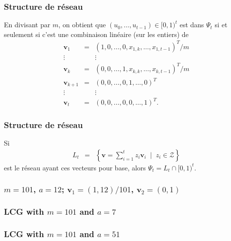 \documentclass[t,usepdftitle=false]{beamer}
\def\bv{\boldsymbol{v}}
\begin{document}
\begin{frame}
\frametitle{Structure de réseau}

En divisant par $m$, on obtient que
$(u_{0},\dots,u_{t-1})\in [0,1)^t$ est dans $\Psi_t$ si et seulement si
c'est une combinaison linéaire (sur les entiers) de
\begin{eqnarray*}
 \bv_1 &=& (1,0,\dots,0, x_{1,k}, \dots, x_{1,t-1})^T/m \\
  \vdots && \vdots \\
 \bv_k &=& (0,0,\dots,1, x_{k,k}, \dots, x_{k,t-1})^T/m \\
 \bv_{k+1} &=& (0,0,\dots,0, 1, \dots, 0)^T \\
  \vdots && \vdots \\
 \bv_{t} &=& (0,0,\dots,0, 0, \dots, 1)^T.
\end{eqnarray*}

\end{frame}

\begin{frame}
\frametitle{Structure de réseau}

Si 
\begin {eqnarray*}
  {L_t} &=& \left\{\bv = \sum_{i=1}^t z_i \bv_i \;\mid\; z_i\in\mathcal{Z}\right\}
\end {eqnarray*}
est le réseau ayant ces vecteurs pour base, alors
${\Psi_t = L_t \cap [0,1)^t}$.

\end{frame}

\begin{frame}
\frametitle{$m=101$, $a=12$; $\bv_1 = {(1,12)/101}$, $\bv_2 = {(0,1)}$}

 

\end{frame}

\begin{frame}
\frametitle{LCG with $m=101$ and $a=7$}

 

\end{frame}

\begin{frame}
\frametitle{LCG with $m=101$ and $a=51$}

 
 
\end{frame}
\end{document}
